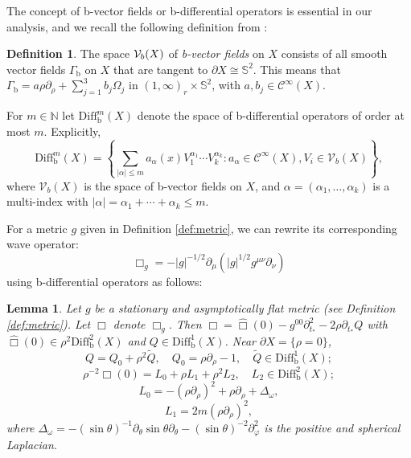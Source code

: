 \documentclass[10pt,a4paper,reqno]{amsart}
\newcommand{\CI}{\mathcal{C}^\infty}
\newcommand{\pa}{\partial}
\newcommand{\inv}{^{-1}}
\renewcommand{\S}{{\mathbb S}}
\newtheorem{lemma}[theorem]{Lemma}
\theoremstyle{definition}
\newtheorem{definition}[theorem]{Definition}
\theoremstyle{remark}
\numberwithin{equation}{section}
\newcommand{\xG}{\Gamma}
\newcommand{\N}{{\mathbb N}}
\newcommand{\cV}{\mathcal V}
\newcommand{\ts}{t_*}
\newcommand{\Diffb}{\mathrm{Diff}_\mathrm{b}}
\newcommand{\wh}{\widehat}
\begin{document}
The concept of b-vector fields or b-differential operators is essential in our analysis, and we recall the following definition from \cite{Hin22}:
\begin{definition}\label{b vectors}
The space $\cV_{\rm{b}}(X)$ of \textit{b-vector fields} on $X$ consists of all smooth vector fields $\xG_\text{b}$ on $X$ that are tangent to $\pa X\cong\S^2$. This means that $\Gamma_{\text{b}} = a\rho\pa_\rho + \sum_{j=1}^3 b_j \Omega_j$ in $(1,\infty)_r\times\S^2$, with $a, b_j\in\CI(X)$. 

For $m\in\N$ let $\Diffb^m(X)$ denote the space of b-differential operators of order at most $m$. Explicitly,
\begin{equation}
\Diffb^m(X) = \left\{ \sum_{|\alpha| \leq m} a_\alpha(x) V_1^{\alpha_1} \cdots V_k^{\alpha_k} : a_\alpha \in \CI(X), V_i \in \mathcal{V}_b(X) \right\},
\end{equation}
where $\mathcal{V}_b(X)$ is the space of b-vector fields on $X$, and $\alpha = (\alpha_1, \ldots, \alpha_k)$ is a multi-index with $|\alpha| = \alpha_1 + \cdots + \alpha_k \leq m$.
\end{definition}

\noindent
For a metric $g$ given in Definition \ref{def:metric}, we can rewrite its corresponding wave operator: 
\[
\Box_g = -|g|^{-1/2}\pa_\mu (|g|^{1/2} g^{\mu\nu} \pa_\nu)
\] 
using b-differential operators as follows:
\begin{lemma}
\label{lem:rewritingBoxg}
Let $g$ be a stationary and asymptotically flat metric (see Definition \ref{def:metric}). Let $\Box$ denote $\Box_g$. Then
$\Box = \wh\Box(0) - g^{00}\pa_{\ts}^2 - 2\rho \pa_{\ts} Q$ with $\wh\Box(0) \in\rho^2\Diffb^2(X)$ and $Q \in \Diffb^1(X)$.
Near $\partial X =\{\rho=0\}$,
\begin{equation}
\label{eqn:Q=Q0+Q'}
    Q = Q_0 + \rho^2\widetilde{Q},\quad Q_0=\rho \pa_\rho - 1, \quad \widetilde{Q} \in \Diffb^1(X);
\end{equation}
\begin{equation}
\label{eqn:Boxhat(0)}
    \rho^{-2} \wh\Box(0) =  L_0 + \rho L_1 + \rho^2 L_2, \quad L_2 \in  \Diffb^2(X) ;
\end{equation}
\begin{equation}
\label{eqn:operator L0}
    L_0 = -(\rho\pa_\rho)^2 + \rho\pa_\rho + \Delta_\omega,
\end{equation}
\begin{equation}
\label{eqn:operator L1}
	L_1 = 2m(\rho\pa_\rho)^2,
\end{equation}
where $\Delta_\omega = -(\sin\theta)\inv \pa_\theta \sin \theta \pa_\theta - (\sin\theta)^{-2} \pa_\varphi^2$ is the positive and spherical Laplacian. 
\end{lemma}
\end{document}
